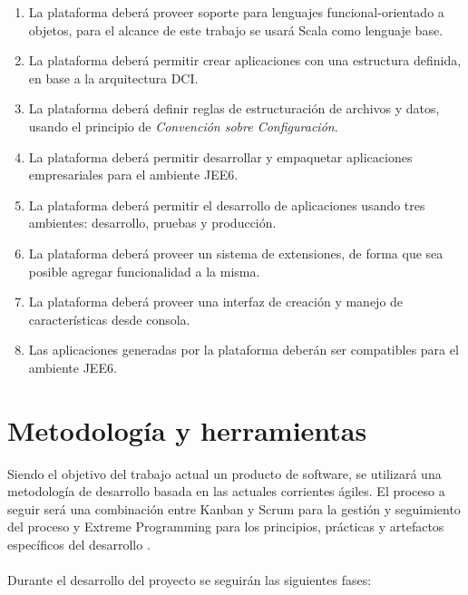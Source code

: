   \begin{enumerate}
    \item La plataforma deber\'a proveer soporte para lenguajes
      funcional-orientado a objetos, para el alcance de este trabajo
      se usar\'a Scala como lenguaje base.

    \item La plataforma deber\'a permitir crear aplicaciones con una
      estructura definida, en base a la arquitectura \gls{DCI}.

    \item La plataforma deber\'a definir reglas de estructuraci\'on de
      archivos y datos, usando el principio de \emph{Convenci\'on
        sobre Configuraci\'on}.

    \item La plataforma deber\'a permitir desarrollar y empaquetar 
      aplicaciones empresariales para el ambiente \gls{JEE6}.

    \item La plataforma deber\'a permitir el desarrollo de
      aplicaciones usando tres ambientes: desarrollo, pruebas y
      producci\'on.

    \item La plataforma deber\'a proveer un sistema de extensiones, 
      de forma que sea posible agregar funcionalidad a la misma.

    \item La plataforma deber\'a proveer una interfaz de creaci\'on y
      manejo de caracter\'isticas desde consola.

    \item Las aplicaciones generadas por la plataforma deber\'an ser
      compatibles para el ambiente JEE6.

  \end{enumerate}

\section*{Metodolog\'ia y herramientas}

  Siendo el objetivo del trabajo actual un producto de software, se
  utilizar\'a una metodolog\'ia de desarrollo basada en las actuales
  corrientes \'agiles. El proceso a seguir ser\'a una combinaci\'on
  entre Kanban y Scrum para la gesti\'on y seguimiento del proceso y
  Extreme Programming para los principios, pr\'acticas y artefactos
  espec\'ificos del desarrollo \citep{kanbanScrum}.  
\\
\\
  Durante el desarrollo del proyecto se seguir\'an las siguientes fases:

